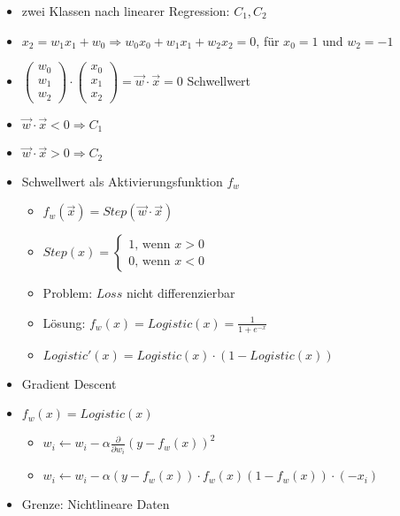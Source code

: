 \documentclass[nonacm=true, language=german]{acmart}
\begin{document}
\begin{itemize}
    \item zwei Klassen nach linearer Regression: $C_1, C_2$
    \item $ x_2 = w_1 x_1 + w_0 \Rightarrow w_0 x_0 + w_1 x_1 + w_2 x_2 = 0 $, für $x_0 = 1$ und $w_2 = -1$
    \item $ \begin{pmatrix} w_0 \\ w_1 \\ w_2 \end{pmatrix} \cdot \begin{pmatrix} x_0 \\ x_1 \\ x_2 \end{pmatrix} = \Vec{w} \cdot \Vec{x} = 0 $ Schwellwert
    \item $ \Vec{w} \cdot \Vec{x} < 0 \Rightarrow C_1 $
    \item $ \Vec{w} \cdot \Vec{x} > 0 \Rightarrow C_2 $
    \item Schwellwert als Aktivierungsfunktion $f_w$
    \begin{itemize}
        \item $ f_w(\Vec{x}) = Step(\Vec{w} \cdot \Vec{x}) $
        \item $ Step(x) = \begin{cases} 1 \text{, wenn } x > 0 \\ 0 \text{, wenn } x < 0 \end{cases} $
        \item Problem: $Loss$ nicht differenzierbar
        \item Lösung: $ f_w(x) = Logistic(x) = \frac{1}{1 + e^{-x}}$
        \item $ Logistic'(x) = Logistic(x) \cdot (1 - Logistic(x)) $
    \end{itemize}
    
    \item Gradient Descent
    \item $ f_w(x) = Logistic(x) $
    \begin{itemize}
        \item $ w_i \leftarrow w_i - \alpha \frac{\partial}{\partial w_i} (y - f_w(x))^2 $
        \item $ w_i \leftarrow w_i - \alpha (y - f_w(x)) \cdot f_w(x)(1 - f_w(x)) \cdot (-x_i) $
    \end{itemize}
    
    \item Grenze: Nichtlineare Daten
\end{itemize}
\end{document}

